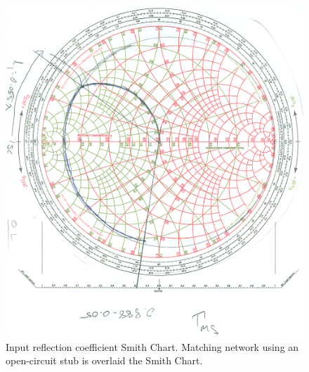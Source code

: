 \documentclass[conference]{IEEEtran}
\begin{document}
\begin{figure}[!h]
\centering
\includegraphics[scale=0.5]{pic/smith1.png}
\caption{Input reflection coefficient Smith Chart.  Matching network using an open-circuit stub is overlaid the Smith Chart.}
\label{fig:smith1}
\end{figure}
\end{document}
